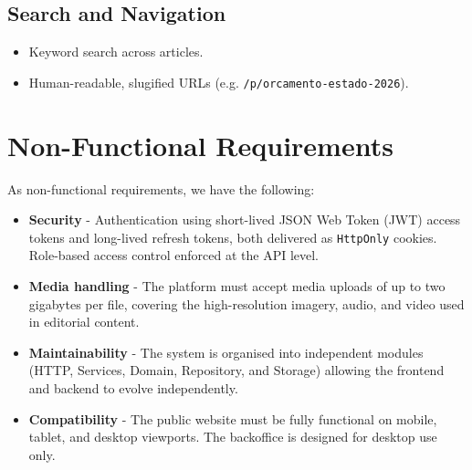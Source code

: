 \subsection{Search and Navigation} \label{sec:req_search}

\begin{itemize}
      \item Keyword search across articles.
      \item Human-readable, slugified URLs (e.g. \texttt{/p/orcamento-estado-2026}).
\end{itemize}

\section{Non-Functional Requirements} \label{sec:req_nonfunctional}

As non-functional requirements, we have the following:

\begin{itemize}
      \item \textbf{Security} - Authentication using short-lived JSON Web Token (JWT) access
            tokens and long-lived refresh tokens, both delivered as \texttt{HttpOnly}
            cookies. Role-based access control enforced at the API level.

      \item \textbf{Media handling} - The platform must accept media uploads of up to two
            gigabytes per file, covering the high-resolution imagery, audio, and video used
            in editorial content.

      \item \textbf{Maintainability} - The system is organised into independent modules
            (HTTP, Services, Domain, Repository, and Storage) allowing the frontend and backend
            to evolve independently.

      \item \textbf{Compatibility} - The public website must be fully functional on mobile,
            tablet, and desktop viewports. The backoffice is designed for desktop use only.
\end{itemize}
